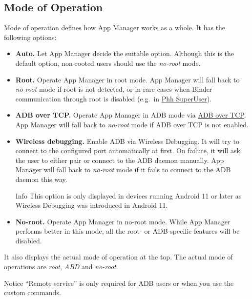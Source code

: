 \subsection{Mode of Operation}\label{subsec:mode-of-operation} %
Mode of operation defines how App Manager works as a whole. It has the following options:
\begin{itemize}
    \item \textbf{Auto.} Let App Manager decide the suitable option.
    Although this is the default option, non-rooted users should use the \textit{no-root} mode.

    \item \textbf{Root.} Operate App Manager in root mode. App Manager will fall back to \textit{no-root} mode if root
    is not detected, or in rare cases when Binder communication through root is disabled (e.g.\ in \href{https://github.com/MuntashirAkon/AppManager/issues/606}{Phh SuperUser}).

    \item \textbf{ADB over TCP.} Operate App Manager in ADB mode via \hyperref[sec:adb-over-tcp]{ADB over TCP}.
    App Manager will fall back to \textit{no-root} mode if ADB over TCP is not enabled.

    \item \textbf{Wireless debugging.} Enable ADB via Wireless Debugging. It will try to connect to the configured port
    automatically at first. On failure, it will ask the user to either pair or connect to the ADB daemon manually.
    App Manager will fall back to \textit{no-root} mode if it fails to connect to the ADB daemon this way.
    \begin{tip}{Info}
        This option is only displayed in devices running Android 11 or later as Wireless Debugging was introduced in Android 11.
    \end{tip}

    \item \textbf{No-root.} Operate App Manager in no-root mode. While App Manager performs better in this mode,
    all the root- or ADB-specific features will be disabled.
\end{itemize}

It also displays the actual mode of operation at the top. The actual mode of operations are
\textit{root}, \textit{ABD} and \textit{no-root}.

\begin{tip}{Notice}
    ``Remote service'' is only required for ADB users or when you use the custom commands.
\end{tip}


